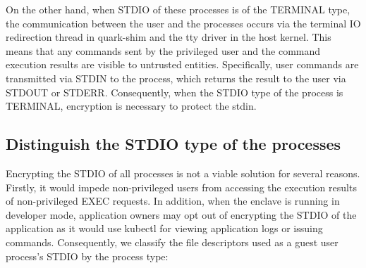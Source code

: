 On the other hand, when STDIO of these processes is of the TERMINAL type, the communication between the user and the processes occurs via the terminal IO redirection thread in quark-shim and the tty driver in the host kernel. This means that any 
commands sent by the privileged user and the command execution results are visible to untrusted entities. Specifically, user commands are transmitted via STDIN to the process, which returns the result to the user via STDOUT or STDERR. Consequently, 
when the STDIO type of the process is TERMINAL, encryption is necessary to protect the stdin.

\subsection{Distinguish the STDIO type of the processes}
Encrypting the STDIO of all processes is not a viable solution for several reasons. Firstly, it would impede non-privileged users from accessing the execution results of non-privileged EXEC requests. In addition, when the enclave is running in 
developer mode, application owners may opt out of encrypting the STDIO of the application as it would use kubectl for viewing application logs or issuing commands. Consequently, we classify the file descriptors used as a guest user process's STDIO 
by the process type:

